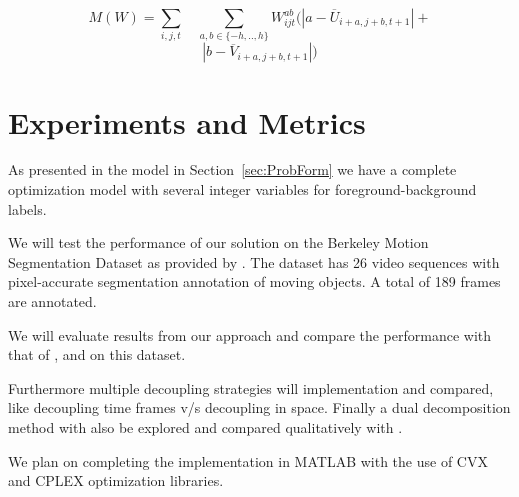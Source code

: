 \documentclass{article}
\begin{document}
\begin{equation}
M(W)=\underset{i,j,t}{\sum}\quad\underset{a,b\in\{-h,..,h\}}{\sum}W_{ijt}^{ab}(|a-\overline{U}_{i+a,j+b,t+1}|+
\end{equation}
\[|b-\overline{V}_{i+a,j+b,t+1}|)
\]



\section{Experiments and Metrics}
\label{sec:Expt}
As presented in the model in Section~\ref{sec:ProbForm} we have a complete optimization
model with several integer variables for foreground-background labels.

We will test the performance of our solution on the 
Berkeley Motion Segmentation Dataset as provided by \cite{brox2010object}.
The dataset has 26 video sequences with pixel-accurate segmentation annotation of moving objects. A total of 189 frames are annotated.

We will evaluate results from our approach and compare the performance with that of \cite{Felzenszwalb2010b}, \cite{Komodakis2011a}
and \cite{brox2010object} on this dataset.

Furthermore multiple decoupling strategies will implementation and compared,
like decoupling time frames v/s decoupling in space. Finally a dual decomposition
method with also be explored and compared qualitatively with \cite{Komodakis2007a}.

We plan on completing the implementation in MATLAB with the use of CVX and CPLEX
optimization libraries.



% 
%





\end{document}
